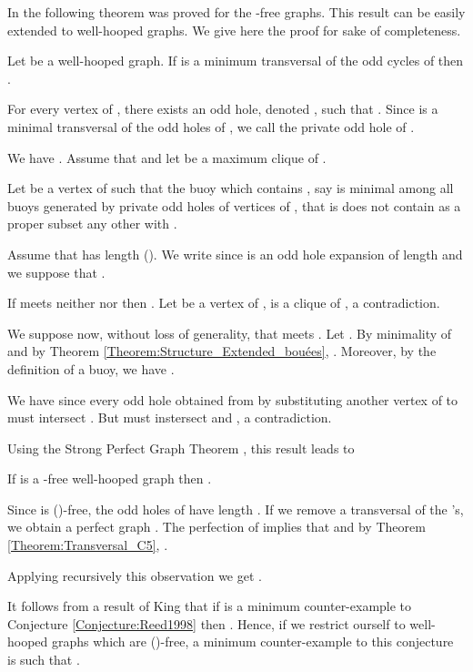 \documentclass{amsart}
\theoremstyle{definition}
\theoremstyle{remark}
\newenvironment{prf}{{\bf \noindent Proof. } }{\hfill\\}
\newcommand{\wh}{well-hooped\xspace}
\newcommand{\extB}{buoy\xspace}
\newcommand{\extBs}{buoys\xspace}
\begin{document}
In \cite{FouGiaMaiThu1995} the following theorem was proved for the -free graphs. This result can be easily extended to \wh graphs. We give here the proof for sake of completeness.
\begin{thm}\label{Theorem:Transversal_C5} Let  be a \wh graph. If  is a minimum transversal of the odd cycles of  then .
\end{thm}
\begin{prf}
 For every vertex  of , there exists an odd hole, denoted , such that . Since  is a minimal transversal of the odd holes of , we call  the private odd hole of .

We have . Assume that  and let  be a maximum clique of .

Let  be a vertex of  such that the \extB which contains , say  is minimal among all \extBs generated by private odd holes of vertices of , that is  
does not contain as a proper subset
any other  with .

Assume that  has length  (). We write  since  is an odd hole expansion of length  and we suppose that .

If  meets neither  nor  then . Let  be a vertex of ,  is a clique of , a contradiction.

We suppose now, without loss of generality, that  meets . Let . By minimality of   and by Theorem \ref{Theorem:Structure_Extended_bouées}, . 
Moreover, by the definition of 
a \extB, we have .

We have  since every odd hole obtained from  by substituting another vertex of  to  must intersect . But  must instersect  and , a contradiction.
\end{prf}


Using the Strong Perfect Graph Theorem \cite{ChuRobSeyTho2006}, this result leads to

 \begin{thm} \label{Theorem:Gfree_ChiBound}
If  is a -free \wh graph then .
 \end{thm}
\begin{prf}
Since  is ()-free, the odd holes of  have length . If we remove a transversal  of the 's, we obtain a perfect graph . The perfection of  implies that  
and by Theorem \ref{Theorem:Transversal_C5}, .

Applying recursively this observation we get .
\end{prf}





It follows from a result of King \cite{Kin2010} that if  is a minimum counter-example to Conjecture \ref{Conjecture:Reed1998}
then . Hence, if we restrict ourself to \wh graphs which are ()-free,
a minimum counter-example to this conjecture is such that .
\end{document}
